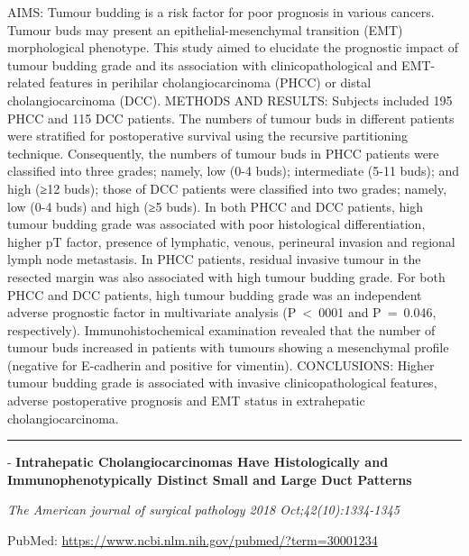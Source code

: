 \documentclass[]{article}
\begin{document}
AIMS: Tumour budding is a risk factor for poor prognosis in various
cancers. Tumour buds may present an epithelial-mesenchymal transition
(EMT) morphological phenotype. This study aimed to elucidate the
prognostic impact of tumour budding grade and its association with
clinicopathological and EMT-related features in perihilar
cholangiocarcinoma (PHCC) or distal cholangiocarcinoma (DCC). METHODS
AND RESULTS: Subjects included 195 PHCC and 115 DCC patients. The
numbers of tumour buds in different patients were stratified for
postoperative survival using the recursive partitioning technique.
Consequently, the numbers of tumour buds in PHCC patients were
classified into three grades; namely, low (0-4 buds); intermediate (5-11
buds); and high (≥12 buds); those of DCC patients were classified into
two grades; namely, low (0-4 buds) and high (≥5 buds). In both PHCC and
DCC patients, high tumour budding grade was associated with poor
histological differentiation, higher pT factor, presence of lymphatic,
venous, perineural invasion and regional lymph node metastasis. In PHCC
patients, residual invasive tumour in the resected margin was also
associated with high tumour budding grade. For both PHCC and DCC
patients, high tumour budding grade was an independent adverse
prognostic factor in multivariate analysis (P~\textless{}~0001 and
P~=~0.046, respectively). Immunohistochemical examination revealed that
the number of tumour buds increased in patients with tumours showing a
mesenchymal profile (negative for E-cadherin and positive for vimentin).
CONCLUSIONS: Higher tumour budding grade is associated with invasive
clinicopathological features, adverse postoperative prognosis and EMT
status in extrahepatic cholangiocarcinoma.

{}

{}

\begin{center}\rule{0.5\linewidth}{\linethickness}\end{center}

 - \textbf{Intrahepatic Cholangiocarcinomas Have Histologically and
Immunophenotypically Distinct Small and Large Duct Patterns}

\emph{The American journal of surgical pathology 2018
Oct;42(10):1334-1345}

PubMed: \url{https://www.ncbi.nlm.nih.gov/pubmed/?term=30001234}
\end{document}
